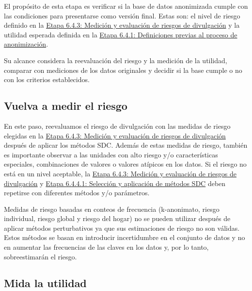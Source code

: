 \documentclass[]{book}
\theoremstyle{definition}
\theoremstyle{definition}
\theoremstyle{definition}
\theoremstyle{definition}
\theoremstyle{remark}
\begin{document}
El propósito de esta etapa es verificar si la base de datos anonimizada cumple con las condiciones para presentarse como versión final. Estas son: el nivel de riesgo definido en la \protect\hyperlink{etapa-6.4.3-mediciuxf3n-y-evaluaciuxf3n-de-riesgos-de-divulgaciuxf3n}{Etapa 6.4.3: Medición y evaluación de riesgos de divulgación} y la utilidad esperada definida en la \protect\hyperlink{etapa-6.4.1-definiciones-previas-al-proceso-de-anonimizaciuxf3n}{Etapa 6.4.1: Definiciones previas al proceso de anonimización}.

Su alcance considera la reevaluación del riesgo y la medición de la utilidad, comparar con mediciones de los datos originales y decidir si la base cumple o no con los criterios establecidos.

\hypertarget{vuelva-a-medir-el-riesgo}{%
\subsection{Vuelva a medir el riesgo}\label{vuelva-a-medir-el-riesgo}}

En este paso, reevaluamos el riesgo de divulgación con las medidas de riesgo elegidas en la \protect\hyperlink{etapa-6.4.3-mediciuxf3n-y-evaluaciuxf3n-de-riesgos-de-divulgaciuxf3n}{Etapa 6.4.3: Medición y evaluación de riesgos de divulgación} después de aplicar los métodos SDC. Además de estas medidas de riesgo, también es importante observar a las unidades con alto riesgo y/o características especiales, combinaciones de valores o valores atípicos en los datos. Si el riesgo no está en un nivel aceptable, la \protect\hyperlink{etapa-6.4.3-mediciuxf3n-y-evaluaciuxf3n-de-riesgos-de-divulgaciuxf3n}{Etapa 6.4.3: Medición y evaluación de riesgos de divulgación} y \protect\hyperlink{etapa-6.4.4.1-selecciuxf3n-y-aplicaciuxf3n-de-muxe9todos-sdc}{Etapa 6.4.4.1: Selección y aplicación de métodos SDC} deben repetirse con diferentes métodos y/o parámetros.

Medidas de riesgo basadas en conteos de frecuencia (k-anonimato, riesgo individual, riesgo global y riesgo del hogar) no se pueden utilizar después de aplicar métodos perturbativos ya que sus estimaciones de riesgo no son válidas. Estos métodos se basan en introducir incertidumbre en el conjunto de datos y no en aumentar las frecuencias de las claves en los datos y, por lo tanto, sobreestimarán el riesgo.

\hypertarget{mida-la-utilidad}{%
\subsection{Mida la utilidad}\label{mida-la-utilidad}}
\end{document}
